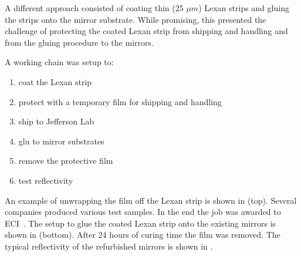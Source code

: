 A different approach consisted of coating thin (25 $\mu m$) Lexan strips and gluing the strips onto the mirror substrate. While promising, this
presented the challenge of protecting the coated Lexan strip from shipping and handling and from the gluing procedure to the mirrors.

A working chain was setup to:

\begin{enumerate}
	\item coat the Lexan strip
	\item protect with a temporary film for shipping and handling
	\item ship to Jefferson Lab
	\item glu to mirror substrates
	\item remove the protective film
	\item test reflectivity
\end{enumerate}

An example of unwrapping the film off the Lexan strip is shown in  (top). Several companies produced various test samples. In the end the
job was awarded to ECI~\cite{ECI}.
The setup to glue the coated Lexan strip onto the existing mirrors is shown in  (bottom).
After 24 hours of curing time the film was removed.
The typical reflectivity of the refurbished mirrors is shown in .


